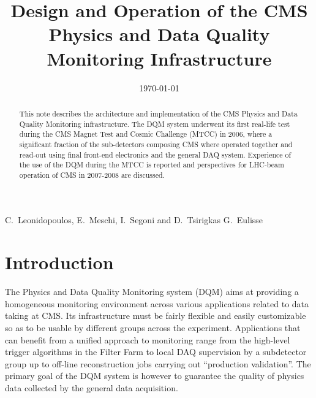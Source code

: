 \documentclass[a4paper]{cmspaper}
\newcommand{\pdfbookmark}[3][1]{}
\begin{document}

\begin{titlepage}

   \date{\today}
\smallskip
\smallskip


  \title{Design and Operation of the CMS Physics and Data Quality
Monitoring Infrastructure}

  \begin{Authlist}
    C.~Leonidopoulos, E.~Meschi, I.~Segoni and D.~Tsirigkas
    G.~Eulisse
  \end{Authlist}


  \begin{abstract}
    \pdfbookmark[1]{Abstract}{Abstract}
  This note describes the architecture and implementation of
the CMS Physics and Data Quality Monitoring infrastructure. The DQM system 
underwent its first real-life test during the CMS Magnet Test and 
Cosmic Challenge (MTCC) in 2006, where a significant fraction of
the sub-detectors composing CMS where operated together and read-out using 
final front-end electronics and the general DAQ system. Experience 
of the use of the DQM during the MTCC is reported and perspectives 
for LHC-beam operation of CMS in 2007-2008 are discussed.
  \end{abstract} 

  
\end{titlepage}

\setcounter{page}{2}%
\linenumbers
\section{Introduction} \label{sec:introduction}
%
The Physics and Data Quality Monitoring system (DQM) aims at
providing a homogeneous monitoring environment across various
applications related to data taking at CMS. Its infrastructure must be fairly
flexible and easily customizable so as to be usable by different
groups across the experiment. Applications that can
benefit from a unified approach to monitoring range from the high-level
trigger algorithms in the Filter Farm to local DAQ supervision by a subdetector group
up to
off-line reconstruction jobs carrying out ``production validation''.
The primary goal of the DQM system is however to guarantee the quality of physics data
collected by the general data acquisition.
\end{document}

